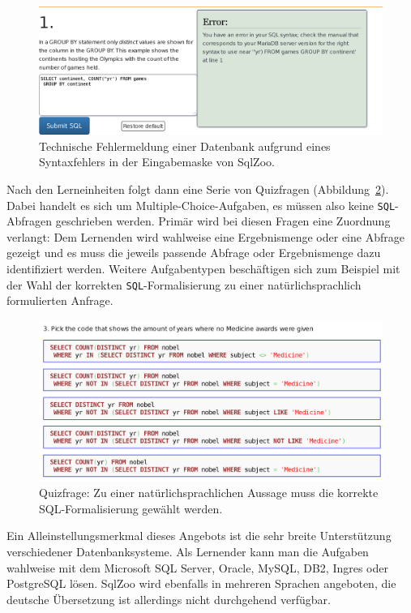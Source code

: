 \begin{figure}[h]
  \centering \includegraphics[width=\textwidth]{images/related-work-sql-zoo-error.png}
  \caption{Technische Fehlermeldung einer Datenbank aufgrund eines Syntaxfehlers in der Eingabemaske von SqlZoo.}
  \label{fig:sqlzoo-check-result}
\end{figure}

Nach den Lerneinheiten folgt dann eine Serie von Quizfragen (Abbildung~\ref{fig:sqlzoo-quiz-sql-formalization}). Dabei handelt es sich um Multiple-Choice-Aufgaben, es müssen also keine \texttt{SQL}-Abfragen geschrieben werden. Primär wird bei diesen Fragen eine Zuordnung verlangt: Dem Lernenden wird wahlweise eine Ergebnismenge oder eine Abfrage gezeigt und es muss die jeweils passende Abfrage oder Ergebnismenge dazu identifiziert werden. Weitere Aufgabentypen beschäftigen sich zum Beispiel mit der Wahl der korrekten \texttt{SQL}-Formalisierung zu einer natürlichsprachlich formulierten Anfrage.

\begin{figure}[h]
  \centering \includegraphics[width=\textwidth]{images/related-work-sql-zoo-quiz-select-sql.png}
  \caption{Quizfrage: Zu einer natürlichsprachlichen Aussage muss die korrekte SQL-Formalisierung gewählt werden.}
  \label{fig:sqlzoo-quiz-sql-formalization}
\end{figure}

Ein Alleinstellungsmerkmal dieses Angebots ist die sehr breite Unterstützung verschiedener Datenbanksysteme. Als Lernender kann man die Aufgaben wahlweise mit dem Microsoft SQL Server, Oracle, MySQL, DB2, Ingres oder PostgreSQL lösen. SqlZoo wird ebenfalls in mehreren Sprachen angeboten, die deutsche Übersetzung ist allerdings nicht durchgehend verfügbar.

